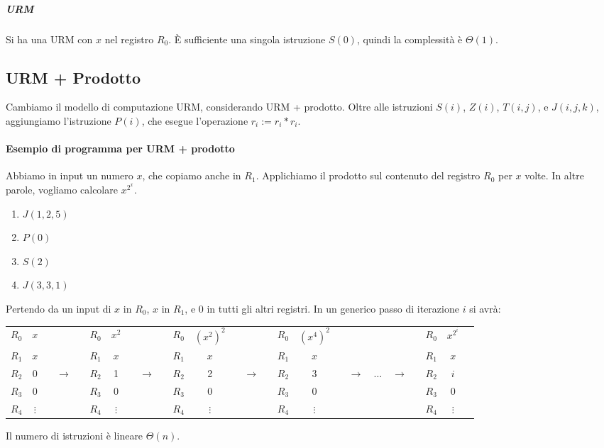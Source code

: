 \subparagraph{URM} Si ha una URM con $x$ nel registro $R_0$. È sufficiente una singola istruzione $S(0)$, quindi la complessità è $\Theta(1)$.


\subsection{URM + Prodotto}
Cambiamo il modello di computazione URM, considerando URM + prodotto. Oltre alle istruzioni $S(i)$, $Z(i)$, $T(i,j)$, e $J(i,j,k)$, aggiungiamo l'istruzione $P(i)$, che esegue l'operazione $r_i:=r_i* r_i$.

\paragraph{Esempio di programma per URM + prodotto} Abbiamo in input un numero $x$, che copiamo anche in $R_1$. Applichiamo il prodotto sul contenuto del registro $R_0$ per $x$ volte. In altre parole, vogliamo calcolare $x^{2^x}$.
\begin{enumerate}
    \item $J(1,2,5)$
    \item $P(0)$
    \item $S(2)$
    \item $J(3,3,1)$
\end{enumerate}
Pertendo da un input di $x$ in $R_0$, $x$ in $R_1$, e $0$ in tutti gli altri registri. In un generico passo di iterazione $i$ si avrà:
\begin{table}[H]
    \centering
    \def\arraystretch{1.3}
    \begin{tabular}{c|c|cc|c|cc|c|cc|c|cccc|c|c}
    \cline{2-2} \cline{5-5} \cline{8-8} \cline{11-11} \cline{16-16}
    $R_0$ & $x$      &       & $R_0$ & $x^2$    &       & $R_0$ & $(x^2)^2$ &       & $R_0$ & $(x^4)^2$ &       &         &       & $R_0$ & $x^{2^i}$  \\ \cline{2-2} \cline{5-5} \cline{8-8} \cline{11-11} \cline{16-16} 
    $R_1$ & $x$      &       & $R_1$ & $x$      &       & $R_1$ & $x$       &       & $R_1$ & $x$       &       &         &       & $R_1$ & $x$      \\ \cline{2-2} \cline{5-5} \cline{8-8} \cline{11-11} \cline{16-16} 
    $R_2$ & 0        & ~ $\to$ ~ & $R_2$ & 1        & ~ $\to$ ~ & $R_2$ & 2         & ~ $\to$ ~ & $R_2$ & 3         & ~ $\to$ & $\dots$ & $\to$ ~ & $R_2$ & $i$    \\ \cline{2-2} \cline{5-5} \cline{8-8} \cline{11-11} \cline{16-16} 
    $R_3$ & 0        &       & $R_3$ & 0        &       & $R_3$ & 0         &       & $R_3$ & 0         &       &         &       & $R_3$ & 0        \\ \cline{2-2} \cline{5-5} \cline{8-8} \cline{11-11} \cline{16-16} 
    $R_4$ & $\vdots$ &       & $R_4$ & $\vdots$ &       & $R_4$ & $\vdots$  &       & $R_4$ & $\vdots$  &       &         &       & $R_4$ & $\vdots$
    \end{tabular}
\end{table}
Il numero di istruzioni è lineare $\Theta(n)$.

